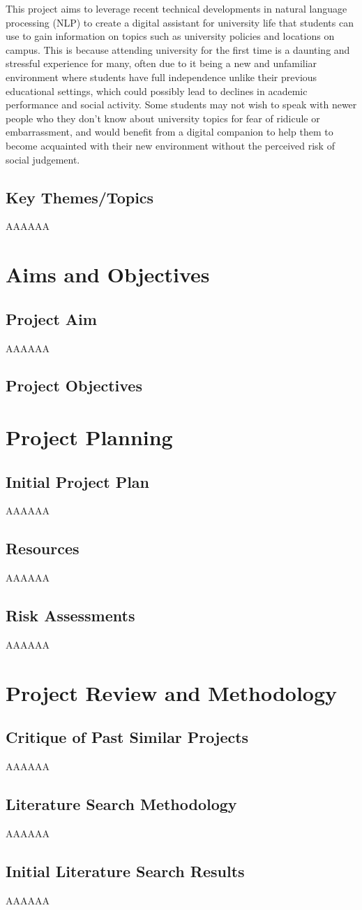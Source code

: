 \documentclass[12pt]{report}
\begin{document}
    \noindent This project aims to leverage recent technical developments in natural language processing (NLP)
    to create a digital assistant for university life that students can use to gain information on topics
    such as university policies and locations on campus. This is because attending university for the first time
    is a daunting and stressful experience for many, often due to it being a new and unfamiliar environment 
    where students have full independence unlike their previous educational settings, which could possibly 
    lead to declines in academic performance and social activity. Some students may not 
    wish to speak with newer people who they don't know about university topics for fear of 
    ridicule or embarrassment, and would benefit from a digital companion to help them to become 
    acquainted with their new environment without the perceived risk of social judgement.

    

    \section{Key Themes/Topics}
    AAAAAA

    \chapter{Aims and Objectives}
    \section{Project Aim}
    AAAAAA
    \section{Project Objectives}

    \chapter{Project Planning}
    \section{Initial Project Plan}
    AAAAAA
    \section{Resources}
    AAAAAA
    \section{Risk Assessments}
    AAAAAA

    \chapter{Project Review and Methodology}
    \section{Critique of Past Similar Projects}
    AAAAAA
    \section{Literature Search Methodology}
    AAAAAA
    \section{Initial Literature Search Results}
    AAAAAA

    \printbibliography
\end{document}
